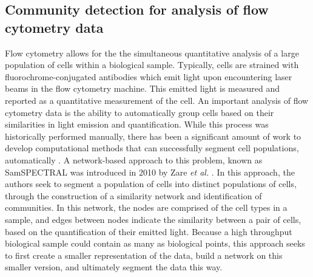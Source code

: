 \subsection{Community detection for analysis of flow cytometry data}
\indent Flow cytometry allows for the the simultaneous quantitative analysis of a large population of cells within a biological sample. Typically, cells are strained with fluorochrome-conjugated antibodies which emit light upon encountering laser beams in the flow cytometry machine. This emitted light is measured and reported as a quantitative measurement of the cell. An important analysis of flow cytometry data is the ability to automatically group cells based on their similarities in light emission and quantification. While this process was historically performed manually, there has been a significant amount of work to develop computational methods that can successfully segment cell populations, automatically \cite{nimaFlow}. A network-based approach to this problem, known as SamSPECTRAL was introduced in 2010 by Zare \emph{et al.} \cite{FlowSpectral}. In this approach, the authors seek to segment a population of cells into distinct populations of cells, through the construction of a similarity network and identification of communities. In this network, the nodes are comprised of the cell types in a sample, and edges between nodes indicate the similarity between a pair of cells, based on the quantification of their emitted light. Because a high throughput biological sample could contain as many as biological points, this approach seeks to first create a smaller representation of the data, build a network on this smaller version, and ultimately segment the data this way. \\
